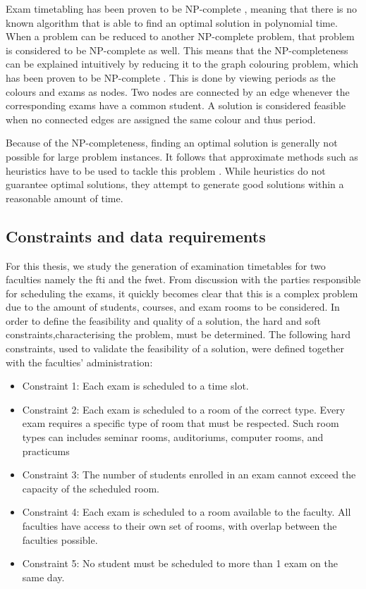 Exam timetabling has been proven to be NP-complete \cite{even1976}, meaning that there is no known algorithm that is able to find an optimal solution in polynomial time. When a problem can be reduced to another NP-complete problem, that problem is considered to be NP-complete as well. This means that the NP-completeness can be explained intuitively by reducing it to the graph colouring problem, which has been proven to be NP-complete \cite{karp1972}. This is done by viewing periods as the colours and exams as nodes. Two nodes are connected by an edge whenever the corresponding exams have a common student. A solution is considered feasible when no connected edges are assigned the same colour and thus period. 

Because of the NP-completeness, finding an optimal solution is generally not possible for large problem instances. It follows that approximate methods such as heuristics have to be used to tackle this problem \cite{farreny1986}. While heuristics do not guarantee optimal solutions, they attempt to generate good solutions within a reasonable amount of time.



\subsection{Constraints and data requirements}

For this thesis, we study the generation of examination timetables for two faculties namely the \acrfull{fti} and the \acrfull{fwet}. From discussion with the parties responsible for scheduling the exams, it quickly becomes clear that this is a complex problem due to the amount of students, courses, and exam rooms to be considered. In order to define the feasibility and quality of a solution, the hard and soft constraints,characterising the problem, must be determined. The following hard constraints, used to validate the feasibility of a solution, were defined together with the faculties' administration:

\begin{itemize}
    \item Constraint 1: Each exam is scheduled to a time slot.
    \item Constraint 2: Each exam is scheduled to a room of the correct type. Every exam requires a specific type of room that must be respected. Such room types can includes seminar rooms, auditoriums, computer rooms, and practicums
    \item Constraint 3: The number of students enrolled in an exam cannot exceed the capacity of the scheduled room.
    \item Constraint 4: Each exam is scheduled to a room available to the faculty. All faculties have access to their own set of rooms, with overlap between the faculties possible.
    \item Constraint 5: No student must be scheduled to more than 1 exam on the same day.
\end{itemize}

